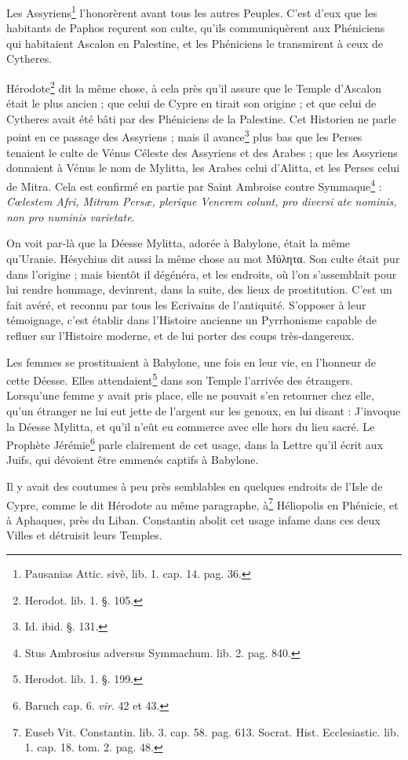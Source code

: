 \documentclass[a4paper, 18pt, oneside]{article}
\begin{document}
Les Assyriens\footnote{Pausanias Attic. sivè, lib. 1. cap. 14. pag. 36.} l'honorèrent avant tous les autres Peuples. C'est d'eux que les habitants de Paphos reçurent son culte, qu'ils communiquèrent aux Phéniciens qui habitaient Ascalon en Palestine, et les Phéniciens le transmirent à ceux de Cytheres.

Hérodote\footnote{Herodot. lib. 1. §. 105.} dit la même chose, à cela près qu'il assure que le Temple d'Ascalon était le plus ancien ; que celui de Cypre en tirait son origine ; et que celui de Cytheres avait été bâti par des Phéniciens de la Palestine. Cet Historien ne parle point en ce passage des Assyriens ; mais il avance\footnote{Id. ibid. §. 131.} plus bas que les Perses tenaient le culte de Vénus Céleste des Assyriens et des Arabes ; que les Assyriens donnaient à Vénus le nom de Mylitta, les Arabes celui d'Alitta, et les Perses celui de Mitra. Cela est confirmé en partie par Saint Ambroise contre Symmaque\footnote{Stus Ambrosius adversus Symmachum. lib. 2. pag. 840.} : \emph{Cœlestem Afri, Mitram Persæ, plerique Venerem colunt, pro diversi ate nominis, non pro numinis varietate}.

On voit par-là que la Déesse Mylitta, adorée à Babylone, était la même qu'Uranie. Hésychius dit aussi la même chose au mot Μύλητα. Son culte était pur dans l'origine ; mais bientôt il dégénéra, et les endroits, où l'on s'assemblait pour lui rendre hommage, devinrent, dans la suite, des lieux de prostitution. C'est un fait avéré, et reconnu par tous les Ecrivains de l'antiquité. S'opposer à leur témoignage, c'est établir dans l'Histoire ancienne un Pyrrhonisme capable de refluer sur l'Histoire moderne, et de lui porter des coups très-dangereux.

Les femmes se prostituaient à Babylone, une fois en leur vie, en l'honneur de cette Déesse. Elles attendaient\footnote{Herodot. lib. 1. §. 199.} dans son Temple l'arrivée des étrangers. Lorsqu'une femme y avait pris place, elle ne pouvait s'en retourner chez elle, qu'un étranger ne lui eut jette de l'argent sur les genoux, en lui disant : J'invoque la Déesse Mylitta, et qu'il n'eût eu commerce avec elle hors du lieu sacré. Le Prophète Jérémie\footnote{Baruch cap. 6. \emph{vir}. 42 et 43.} parle clairement de cet usage, dans la Lettre qu'il écrit aux Juifs, qui dévoient être emmenés captifs à Babylone.

Il y avait des coutumes à peu près semblables en quelques endroits de l'Isle de Cypre, comme le dit Hérodote au même paragraphe, à\footnote{Euseb Vit. Constantin. lib. 3. cap. 58. pag. 613. Socrat. Hist. Ecclesiastic. lib. 1. cap. 18. tom. 2. pag. 48.} Héliopolis en Phénicie, et à Aphaques, près du Liban. Constantin abolit cet usage infame dans ces deux Villes et détruisit leurs Temples.
\end{document}
